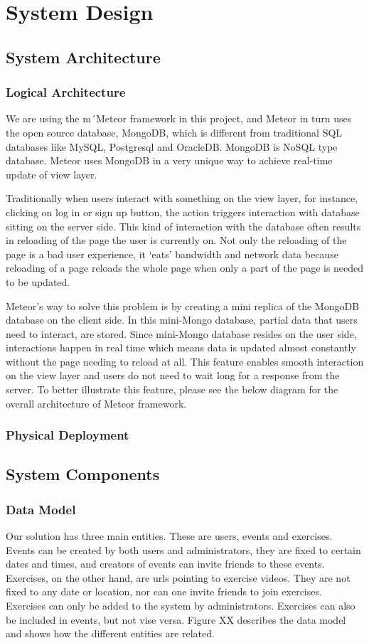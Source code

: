 \chapter{System Design}
\section{System Architecture}
\subsection{Logical Architecture}
We are using the m´Meteor framework in this project, and Meteor in turn uses the open source database, MongoDB, which is different from traditional SQL databases like MySQL, Postgresql and OracleDB. MongoDB is NoSQL type database. Meteor uses MongoDB in a very unique way to achieve real-time update of view layer.

Traditionally when users interact with something on the view layer, for instance, clicking on log in or sign up button, the action triggers interaction with database sitting on the server side. This kind of interaction with the database often results in reloading of the page the user is currently on. Not only the reloading of the page is a bad user experience, it ‘eats’ bandwidth and network data because reloading of a page reloads the whole page when only a part of the page is needed to be updated.

Meteor’s way to solve this problem is by creating a mini replica of the MongoDB database on the client side. In this mini-Mongo database, partial data that users need to interact, are stored. Since mini-Mongo database resides on the user side, interactions happen in real time which means data is updated almost constantly without the page needing to reload at all. This feature enables smooth interaction on the view layer and users do not need to wait long for a response from the server. To better illustrate this feature, please see the below diagram for the overall architecture of Meteor framework. 

\subsection{Physical Deployment}
\section{System Components}
\subsection{Data Model}
Our solution has three main entities. These are users, events and exercises. Events can be created by both users and administrators, they are fixed to certain dates and times, and creators of events can invite friends to these events. Exercises, on the other hand, are urls pointing to exercise videos. They are not fixed to any date or location, nor can one invite friends to join exercises. Exercises can only be added to the system by administrators. Exercises can also be included in events, but not vise versa. Figure XX describes the data model and shows how the different entities are related.

